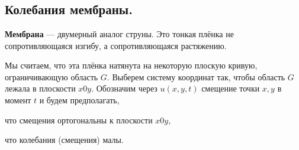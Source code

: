 \chapter{}
\label{lecture15}
\section{Колебания мембраны.}
\label{lecture15section1}
\begin{Def}
	\textbf{Мембрана} --- двумерный аналог струны. Это тонкая плёнка не сопротивляющаяся изгибу, а сопротивляющаяся растяжению.
\end{Def}
Мы считаем, что эта плёнка натянута на некоторую плоскую кривую, ограничивающую область $G$. Выберем систему координат так, чтобы область $G$ лежала в плоскости $x0y$. Обозначим через $u(x,y,t)$ смещение точки $x,y$ в момент $t$ и будем предполагать,
\begin{enumerate1}
	\item что смещения ортогональны к плоскости $x0y$,
	\item что колебания (смещения) малы.
\end{enumerate1}



